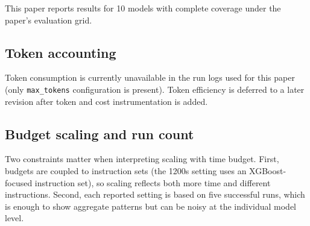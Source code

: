 This paper reports results for 10 models with complete coverage under the paper's evaluation grid.

\subsection{Token accounting}
Token consumption is currently unavailable in the run logs used for this paper (only \texttt{max\_tokens} configuration is present). Token efficiency is deferred to a later revision after token and cost instrumentation is added.

\subsection{Budget scaling and run count}
Two constraints matter when interpreting scaling with time budget. First, budgets are coupled to instruction sets (the 1200s setting uses an XGBoost-focused instruction set), so scaling reflects both more time and different instructions. Second, each reported setting is based on five successful runs, which is enough to show aggregate patterns but can be noisy at the individual model level.

